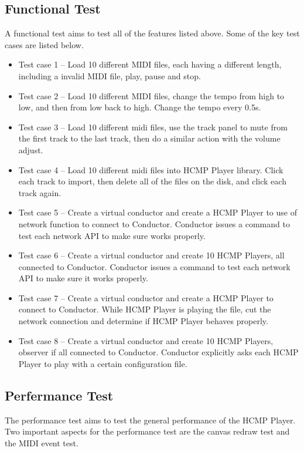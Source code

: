 \subsection{Functional Test}
A functional test aims to test all of the features listed above. Some of the 
key test cases are listed below.
\begin{itemize}
  \item Test case 1 -- Load 10 different MIDI files, each having a different
        length, including a invalid MIDI file, play, pause and stop. 
  \item Test case 2 -- Load 10 different MIDI files, change the tempo from high to 
        low, and then from low back to high. Change the tempo every 0.5s.
  \item Test case 3 -- Load 10 different midi files, use the track panel to mute
        from the first track to the last track, then do a similar action with the 
        volume adjust.
  \item Test case 4 -- Load 10 different midi files into HCMP Player library. Click
        each track to import, then delete all of the files on the disk, and 
        click each track again.  
  \item Test case 5 -- Create a virtual conductor and create a HCMP Player to use  
        of network function to connect to Conductor. Conductor issues a command
        to test each network API to make sure works properly. 
  \item Test case 6 -- Create a virtual conductor and create 10 HCMP Players, 
        all connected to Conductor. Conductor issues a command to test each network
        API to make sure it works properly.
  \item Test case 7 -- Create a virtual conductor and create a HCMP Player to connect
        to Conductor. While HCMP Player is playing the file, cut the network connection
        and determine if HCMP Player behaves properly.
  \item Test case 8 -- Create a virtual conductor and create 10 HCMP Players, observer
        if all connected to Conductor. Conductor explicitly asks each HCMP Player to 
        play with a certain configuration file.
\end{itemize}

\subsection{Perfermance Test}
The performance test aims to test the general performance of the HCMP Player. Two 
important aspects for the performance test are the canvas redraw test and the MIDI
event test. 


